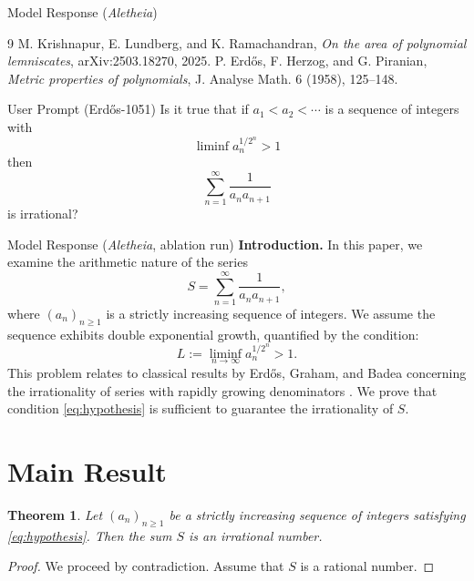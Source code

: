 \documentclass[11pt]{article}
\newtheorem{theorem}{Theorem}
\begin{document}
\begin{solution}{Model Response (\emph{Aletheia})}
\begin{thebibliography}{9}
 M. Krishnapur, E. Lundberg, and K. Ramachandran, \textit{On the area of polynomial lemniscates}, arXiv:2503.18270, 2025.
 P. Erdős, F. Herzog, and G. Piranian, \textit{Metric properties of polynomials}, J. Analyse Math. 6 (1958), 125–148.
\end{thebibliography}
\end{solution}

\begin{problem}{User Prompt (Erd\H{o}s-1051)}
Is it true that if $a_1<a_2<\cdots$ is a sequence of integers with\[\liminf a_n^{1/2^n}>1\]then\[\sum_{n=1}^\infty \frac{1}{a_na_{n+1}}\]is irrational?
\end{problem}

\begin{solution}{Model Response (\emph{Aletheia}, ablation run)}
    \textbf{Introduction.} In this paper, we examine the arithmetic nature of the series
\[ S = \sum_{n=1}^\infty \frac{1}{a_n a_{n+1}}, \]
where $(a_n)_{n \ge 1}$ is a strictly increasing sequence of integers. We assume the sequence exhibits double exponential growth, quantified by the condition:
\begin{equation} \label{eq:hypothesis}
L := \liminf_{n\to\infty} a_n^{1/2^n} > 1.
\end{equation}
This problem relates to classical results by Erd\H{o}s, Graham, and Badea concerning the irrationality of series with rapidly growing denominators \cite{Erdos1980, Badea1987}. We prove that condition \eqref{eq:hypothesis} is sufficient to guarantee the irrationality of $S$.

\section{Main Result}

\begin{theorem}
Let $(a_n)_{n \ge 1}$ be a strictly increasing sequence of integers satisfying \eqref{eq:hypothesis}. Then the sum $S$ is an irrational number.
\end{theorem}

\begin{proof}
We proceed by contradiction. Assume that $S$ is a rational number.


\end{proof}
\end{solution}
\end{document}
